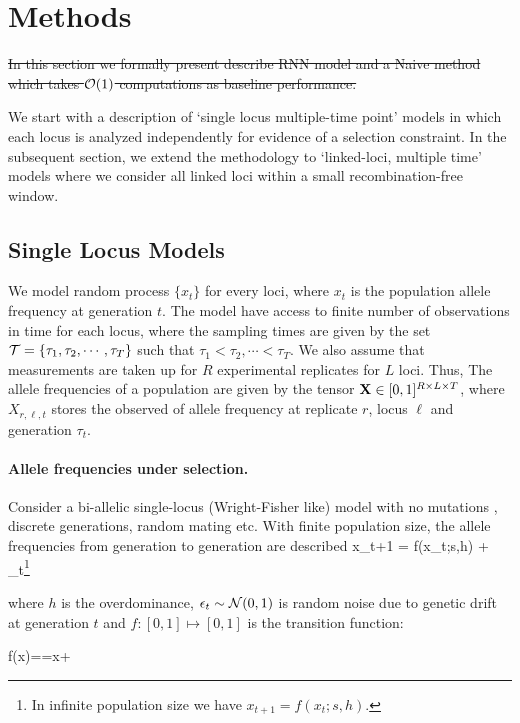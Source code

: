 \section{Methods}
\sout{In this section we formally present describe RNN model and a
  Naive method which takes ${\cal O}(1)$ computations as baseline
  performance.}  

We start with a description of `single locus multiple-time point'
models in which each locus is analyzed independently for evidence of a
selection constraint. In the subsequent section, we extend the
methodology to `linked-loci, multiple time' models where we consider
all linked loci within a small recombination-free window.

\subsection*{Single Locus Models}
We model random process $\{x_t\}$ for every loci, where $x_t$ is the
population allele frequency at generation $t$. The model have access
to finite number of observations in time for each locus, where the
sampling times are given by the set ${\cal T}=\{\tau_1,\tau_2,\cdots,
\tau_T \}$ such that $\tau_1<\tau_2,\cdots<\tau_T$. We also assume
that measurements are taken up for $R$ experimental replicates for $L$
loci. Thus, The allele frequencies of a population are given by the
tensor ${\mathbf X} \in [0,1]^{R \times L \times T}$, where $X_{r,\ell,t}$
stores the observed of allele frequency at replicate $r$, locus $\ell$
and generation $\tau_t$.

\paragraph{Allele frequencies under selection.}
Consider a bi-allelic single-locus (Wright-Fisher like) model with no
mutations \cite{book-mathpopgen}, discrete generations, random mating
etc. With finite population size, the allele frequencies from
generation to generation are described 
\beq\label{eq:trans0}
x_{t+1} = f(x_t;s,h)  + \epsilon_t\footnote{In infinite population
  size we have $x_{t+1} = f(x_t;s,h)$.} 
\eeq

where $h$ is the overdominance, $\epsilon_t \sim {\cal N}(0,1)$ is random noise due to
genetic drift at generation $t$ and $f: [0,1] \mapsto [0,1]$ is the
transition function:

\beq
f(x)==x+
\eeq


